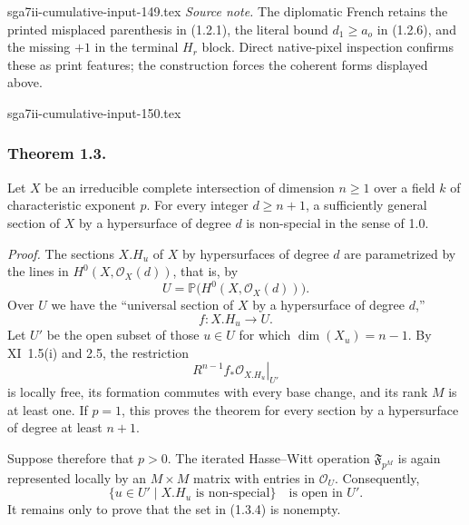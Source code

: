 \begin{filecontents*}{sga7ii-cumulative-input-149.tex}
\medskip
\noindent\emph{Source note.}
The diplomatic French retains the printed misplaced parenthesis in (1.2.1),
the literal bound $d_1\geq a_o$ in (1.2.6), and the missing $+1$ in the
terminal $H_r$ block.  Direct native-pixel inspection confirms these as print
features; the construction forces the coherent forms displayed above.
\end{filecontents*}
\begin{filecontents*}{sga7ii-cumulative-input-150.tex}
\subsubsection*{Theorem 1.3.}
Let $X$ be an irreducible complete intersection of dimension $n\geq1$ over
a field $k$ of characteristic exponent $p$.  For every integer $d\geq n+1$,
a sufficiently general section of $X$ by a hypersurface of degree $d$ is
non-special in the sense of 1.0.

\medskip
\noindent\emph{Proof.}
The sections $X.H_u$ of $X$ by hypersurfaces of degree $d$ are parametrized
by the lines in $H^0(X,\mathcal O_X(d))$, that is, by
\begin{equation}\tag{1.3.1}
U=\mathbb P\bigl(H^0(X,\mathcal O_X(d))\bigr).
\end{equation}
Over $U$ we have the ``universal section of $X$ by a hypersurface of degree
$d$,''
\begin{equation}\tag{1.3.2}
f:X.H_u\longrightarrow U.
\end{equation}
Let $U'$ be the open subset of those $u\in U$ for which
$\dim(X_u)=n-1$.  By XI~1.5(i) and 2.5, the restriction
\begin{equation}\tag{1.3.3}
\left.R^{n-1}f_*\mathcal O_{X.H_u}\right|_{U'}
\end{equation}
is locally free, its formation commutes with every base change, and its rank
$M$ is at least one.  If $p=1$, this proves the theorem for every section by
a hypersurface of degree at least $n+1$.

Suppose therefore that $p>0$.  The iterated Hasse--Witt operation
$\mathfrak F_{p^M}$ is again represented locally by an $M\times M$ matrix
with entries in $\mathcal O_U$.  Consequently,
\begin{equation}\tag{1.3.4}
\{u\in U'\mid X.H_u\text{ is non-special}\}
\quad\text{is open in }U'.
\end{equation}
It remains only to prove that the set in (1.3.4) is nonempty.


\end{filecontents*}
